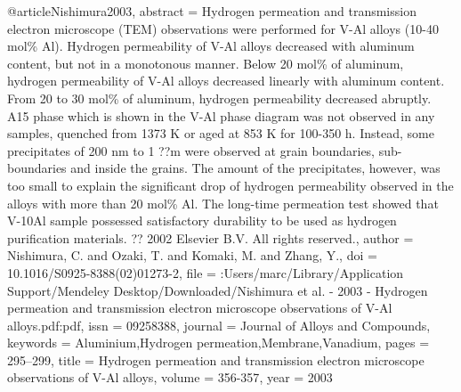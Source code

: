 @article{Nishimura2003,
abstract = {Hydrogen permeation and transmission electron microscope (TEM) observations were performed for V-Al alloys (10-40 mol{\%} Al). Hydrogen permeability of V-Al alloys decreased with aluminum content, but not in a monotonous manner. Below 20 mol{\%} of aluminum, hydrogen permeability of V-Al alloys decreased linearly with aluminum content. From 20 to 30 mol{\%} of aluminum, hydrogen permeability decreased abruptly. A15 phase which is shown in the V-Al phase diagram was not observed in any samples, quenched from 1373 K or aged at 853 K for 100-350 h. Instead, some precipitates of 200 nm to 1 ??m were observed at grain boundaries, sub-boundaries and inside the grains. The amount of the precipitates, however, was too small to explain the significant drop of hydrogen permeability observed in the alloys with more than 20 mol{\%} Al. The long-time permeation test showed that V-10Al sample possessed satisfactory durability to be used as hydrogen purification materials. ?? 2002 Elsevier B.V. All rights reserved.},
author = {Nishimura, C. and Ozaki, T. and Komaki, M. and Zhang, Y.},
doi = {10.1016/S0925-8388(02)01273-2},
file = {:Users/marc/Library/Application Support/Mendeley Desktop/Downloaded/Nishimura et al. - 2003 - Hydrogen permeation and transmission electron microscope observations of V-Al alloys.pdf:pdf},
issn = {09258388},
journal = {Journal of Alloys and Compounds},
keywords = {Aluminium,Hydrogen permeation,Membrane,Vanadium},
pages = {295--299},
title = {{Hydrogen permeation and transmission electron microscope observations of V-Al alloys}},
volume = {356-357},
year = {2003}
}
